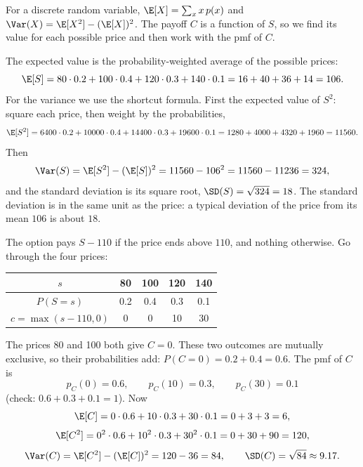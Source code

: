 \begin{solution}
	\idea For a discrete random variable, $\E[X]=\sum_x x\,p(x)$ and
	$\Var(X)=\E[X^2]-(\E[X])^2$. The payoff $C$ is a function of $S$, so we
	find its value for each possible price and then work with the pmf of $C$.

	 The expected value is the probability-weighted average of the
	possible prices:
	\[ \E[S]=80\cdot0.2+100\cdot0.4+120\cdot0.3+140\cdot0.1
		=16+40+36+14=106. \]
	For the variance we use the shortcut formula. First the expected value of
	$S^2$: square each price, then weight by the probabilities,
	\[ \E[S^2]=6400\cdot0.2+10000\cdot0.4+14400\cdot0.3+19600\cdot0.1
		=1280+4000+4320+1960=11560. \]
	Then
	\[ \Var(S)=\E[S^2]-(\E[S])^2=11560-106^2=11560-11236=324, \]
	and the standard deviation is its square root, $\SD(S)=\sqrt{324}=18$.
	The standard deviation is in the same unit as the price: a typical
	deviation of the price from its mean $106$ is about $18$.

	 The option pays $S-110$ if the price ends above $110$, and
	nothing otherwise. Go through the four prices:
	\begin{center}
		\begin{tabular}{c|cccc}
			$s$                & 80  & 100 & 120 & 140 \\\hline
			$P(S=s)$           & 0.2 & 0.4 & 0.3 & 0.1 \\
			$c=\max(s-110,0)$  & 0   & 0   & 10  & 30
		\end{tabular}
	\end{center}
	The prices 80 and 100 both give $C=0$. These two outcomes are mutually
	exclusive, so their probabilities add: $P(C=0)=0.2+0.4=0.6$. The pmf of $C$
	is
	\[ p_C(0)=0.6,\qquad p_C(10)=0.3,\qquad p_C(30)=0.1 \]
	(check: $0.6+0.3+0.1=1$). Now
	\[ \E[C]=0\cdot0.6+10\cdot0.3+30\cdot0.1=0+3+3=6, \]
	\[ \E[C^2]=0^2\cdot0.6+10^2\cdot0.3+30^2\cdot0.1=0+30+90=120, \]
	\[ \Var(C)=\E[C^2]-(\E[C])^2=120-36=84,\qquad
		\SD(C)=\sqrt{84}\approx9.17. \]


\end{solution}
